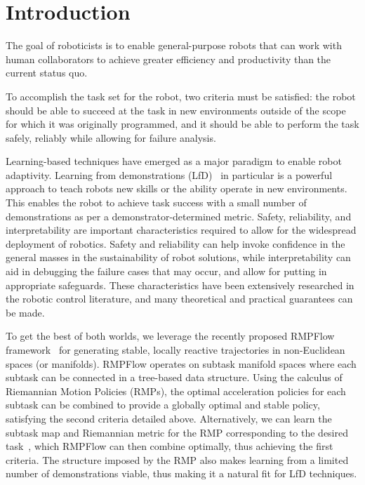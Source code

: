 \section{Introduction}

The goal of roboticists is to enable general-purpose robots that can work with human collaborators to achieve greater efficiency and productivity than the current status quo.

To accomplish the task set for the robot, two criteria must be satisfied: the robot should be able to succeed at the task in new environments outside of the scope for which it was originally programmed, and it should be able to perform the task safely, reliably while allowing for failure analysis.

Learning-based techniques have emerged as a major paradigm to enable robot adaptivity. Learning from demonstrations (LfD)~\cite{Argall09ras} in particular is a powerful approach to teach robots new skills or the ability operate in new environments. This enables the robot to achieve task success with a small number of demonstrations as per a demonstrator-determined metric.
Safety, reliability, and interpretability are important characteristics required to allow for the widespread deployment of robotics. Safety and reliability can help invoke confidence in the general masses in the sustainability of robot solutions, while interpretability can aid in debugging the failure cases that may occur, and allow for putting in appropriate safeguards. These characteristics have been extensively researched in the robotic control literature, and many theoretical and practical guarantees can be made.

To get the best of both worlds, we leverage the recently proposed RMPFlow framework~\cite{Cheng21tase} for generating stable, locally reactive trajectories in non-Euclidean spaces (or manifolds). RMPFlow operates on subtask manifold spaces where each subtask can be connected in a tree-based data structure. Using the calculus of Riemannian Motion Policies (RMPs), the optimal acceleration policies for each subtask can be combined to provide a globally optimal and stable policy, satisfying the second criteria detailed above. Alternatively, we can learn the subtask map and Riemannian metric for the RMP corresponding to the desired task~\cite{Rana20corl,Rana20ldc}, which RMPFlow can then combine optimally, thus achieving the first criteria. The structure imposed by the RMP also makes learning from a limited number of demonstrations viable, thus making it a natural fit for LfD techniques.

